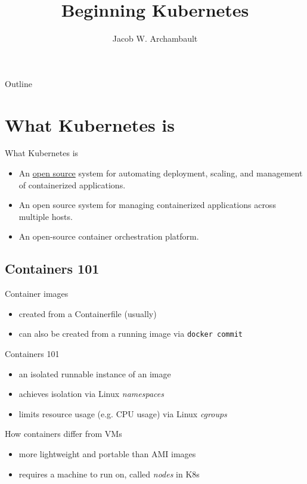 \documentclass{beamer}
\title{Beginning Kubernetes}
\author{Jacob W. Archambault}
\institute{SAIC}
\begin{document}
	\begin{frame}[plain]
		\titlepage
	\end{frame}
	\begin{frame}{Outline}
		\tableofcontents[pausesections]
	\end{frame}
	\section{What Kubernetes is}
	\begin{frame}{What Kubernetes is}
		\begin{itemize}
			\item An \href{https://github.com/kubernetes/kubernetes}{open source} system for automating deployment, scaling, and management of containerized applications.
			\pause
			\item An open source system for managing containerized applications across multiple hosts.
			\pause
			\item An open-source container orchestration platform.
		\end{itemize}
	\end{frame}
	\subsection{Containers 101}
	\begin{frame}{Container images}
		\begin{itemize}
			\item created from a Containerfile (usually)
			\pause
			\item can also be created from a running image via \texttt{docker commit}
		\end{itemize}
	\end{frame}
	\begin{frame}{Containers 101}
		\begin{itemize}
			\item an isolated runnable instance of an image 
			\pause 
			\item achieves isolation via Linux \textit{namespaces}
			\pause
			\item limits resource usage (e.g. CPU usage) via Linux \textit{cgroups}
		\end{itemize}
	\end{frame}
	\begin{frame}{How containers differ from VMs}
		\begin{itemize}
			\item more lightweight and portable than AMI images
			\pause
			\item requires a machine to run on, called \textit{nodes} in K8s
		\end{itemize}
	\end{frame}
\end{document}
